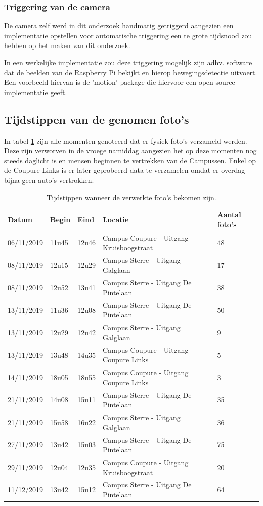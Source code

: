 \subsubsection{Triggering van de camera}
De camera zelf werd in dit onderzoek handmatig getriggerd aangezien een implementatie opstellen voor automatische triggering een te grote tijdsnood zou hebben op het maken van dit onderzoek.

In een werkelijke implementatie zou deze triggering mogelijk zijn adhv. software dat de beelden van de Raspberry Pi bekijkt en hierop bewegingsdetectie uitvoert. Een voorbeeld hiervan is de 'motion' package die hiervoor een open-source implementatie geeft.

\subsection{Tijdstippen van de genomen foto's}
In tabel \ref{tab:fototijdstippen} zijn alle momenten genoteerd dat er fysiek foto's verzameld werden. Deze zijn verworven in de vroege namiddag aangezien het op deze momenten nog steeds daglicht is en mensen beginnen te vertrekken van de Campussen. Enkel op de Coupure Links is er later geprobeerd data te verzamelen omdat er overdag bijna geen auto's vertrokken.
\begin{table}[h!]
\centering
\begin{tabular}{l|l|l|l|l}
	Datum 		& Begin & Eind	& Locatie	& Aantal foto's \\ \hline
	06/11/2019	& 11u45 & 12u46	& Campus Coupure - Uitgang Kruisboogstraat	& 48	\\
	08/11/2019	& 12u15 & 12u29	& Campus Sterre - Uitgang Galglaan	& 17	\\
	08/11/2019	& 12u52 & 13u41	& Campus Sterre - Uitgang De Pintelaan	& 38	\\
	13/11/2019	& 11u36 & 12u08	& Campus Sterre - Uitgang De Pintelaan	& 50	\\
	13/11/2019	& 12u29 & 12u42	& Campus Sterre - Uitgang Galglaan	& 9	\\
	13/11/2019	& 13u48 & 14u35	& Campus Coupure - Uitgang Coupure Links	& 5	\\
	14/11/2019	& 18u05 & 18u55	& Campus Coupure - Uitgang Coupure Links	& 3	\\
	21/11/2019	& 14u08 & 15u11	& Campus Sterre - Uitgang De Pintelaan	& 35	\\
	21/11/2019	& 15u58 & 16u22	& Campus Sterre - Uitgang Galglaan	& 36	\\
	27/11/2019	& 13u42 & 15u03	& Campus Sterre - Uitgang De Pintelaan	& 75	\\
	29/11/2019	& 12u04 & 12u35	& Campus Coupure - Uitgang Kruisboogstraat	& 20	\\
	11/12/2019	& 13u42 & 15u12	& Campus Sterre - Uitgang De Pintelaan	& 64	\\
\end{tabular}
\caption{Tijdstippen wanneer de verwerkte foto's bekomen zijn.}
\label{tab:fototijdstippen}
\end{table}

